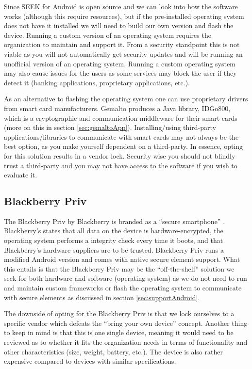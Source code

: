 Since SEEK for Android is open source and we can look into how the software works (although this require resources), but if the pre-installed operating system does not have it installed we will need to build our own version and flash the device. Running a custom version of an operating system requires the organization to maintain and support it. From a security standpoint this is not viable as you will not automatically get security updates and will be running an unofficial version of an operating system. Running a custom operating system may also cause issues for the users as some services may block the user if they detect it (banking applications, proprietary applications, etc.).

As an alternative to flashing the operating system one can use proprietary drivers from smart card manufacturers. Gemalto produces a Java library, IDGo800, which is a cryptographic and communication middleware for their smart cards (more on this in section \ref{sec:gemaltoApp}). Installing/using third-party applications/libraries to communicate with smart cards may not always be the best option, as you make yourself dependent on a third-party. In essence, opting for this solution results in a vendor lock. Security wise you should not blindly trust a third-party and you may not have access to the software if you wish to evaluate it.

\subsection{Blackberry Priv}
\label{sec:blackberry}
The Blackberry Priv by Blackberry is branded as a ``secure smartphone'' \cite{blackberryPriv}. Blackberry's states that all data on the device is hardware-encrypted, the operating system performs a integrity check every time it boots, and that Blackberry's hardware suppliers are to be trusted. Blackberry Priv runs a modified Android version and comes with native secure element support. What this entails is that the Blackberry Priv may be the ``off-the-shelf'' solution we seek for both hardware and software (operating system) as we do not need to run and maintain custom frameworks or flash the operating system to communicate with secure elements as discussed in section \ref{sec:supportAndroid}.

The downside of opting for the Blackberry Priv is that we lock ourselves to a specific vendor which defeats the ``bring your own device'' concept. Another thing to keep in mind is that this is one single device, meaning it would need to be reviewed as to whether it fits the organization needs in terms of functionality and other characteristics (size, weight, battery, etc.). The device is also rather expensive compared to devices with similar specifications.


